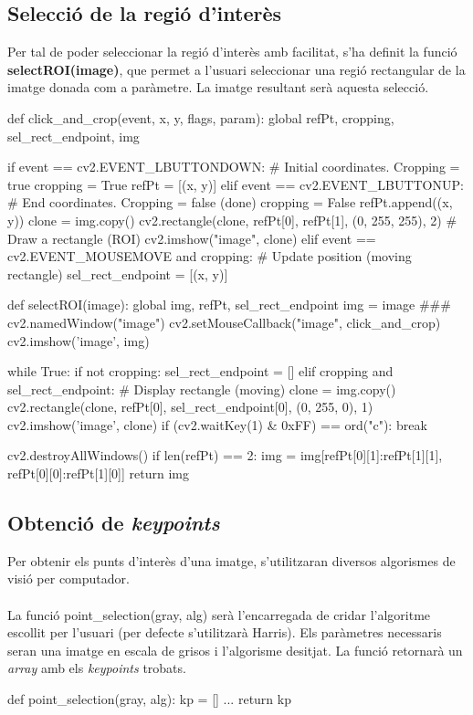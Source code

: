 	\subsection{Selecció de la regió d'interès}
		Per tal de poder seleccionar la regió d'interès amb facilitat, s'ha definit la funció \textbf{selectROI(image)}, que permet a l'usuari seleccionar una regió rectangular de la imatge donada
		com a paràmetre. La imatge resultant serà aquesta selecció.\\
		\begin{python}
def click_and_crop(event, x, y, flags, param):
	global refPt, cropping, sel_rect_endpoint, img
 
	if event == cv2.EVENT_LBUTTONDOWN:	# Initial coordinates. Cropping = true
		cropping = True
		refPt = [(x, y)] 
	elif event == cv2.EVENT_LBUTTONUP:	# End coordinates. Cropping = false (done)
		cropping = False
		refPt.append((x, y)) 
		clone = img.copy()
		cv2.rectangle(clone, refPt[0], refPt[1], (0, 255, 255), 2)	# Draw a rectangle (ROI)
		cv2.imshow("image", clone)
	elif event == cv2.EVENT_MOUSEMOVE and cropping:	# Update position (moving rectangle)
		sel_rect_endpoint = [(x, y)]

def selectROI(image):
	global img, refPt, sel_rect_endpoint
	img = image ###
	cv2.namedWindow("image")
	cv2.setMouseCallback("image", click_and_crop)
	cv2.imshow('image', img)

	while True:
		if not cropping:
			sel_rect_endpoint = []
		elif cropping and sel_rect_endpoint:	# Display rectangle (moving)
			clone = img.copy()
			cv2.rectangle(clone, refPt[0], sel_rect_endpoint[0], (0, 255, 0), 1)
			cv2.imshow('image', clone)
		if (cv2.waitKey(1) & 0xFF) == ord("c"):
			break

	cv2.destroyAllWindows()
	if len(refPt) == 2:
		img = img[refPt[0][1]:refPt[1][1], refPt[0][0]:refPt[1][0]]
	return img
		\end{python}
	\subsection{Obtenció de \textit{keypoints}}
		Per obtenir els punts d'interès d'una imatge, s'utilitzaran diversos algorismes de visió per computador.\\\\
		La funció point{\_}selection(gray, alg) serà l'encarregada de cridar l'algoritme escollit per l'usuari (per defecte s'utilitzarà Harris).
		Els paràmetres necessaris seran una imatge en escala de grisos i l'algorisme desitjat. La funció retornarà un \textit{array} amb els \textit{keypoints} trobats. \\
		\begin{python}
def point_selection(gray, alg):
	kp = []
	...
	return kp
		\end{python}


